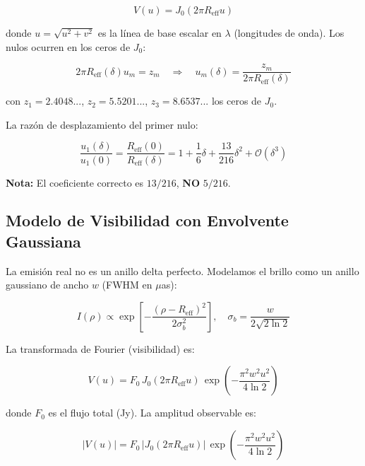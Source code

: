 \documentclass[12pt,a4paper]{article}
\begin{document}
\begin{equation}
V(u) = J_0(2\pi R_{\text{eff}} u)
\end{equation}

donde $u = \sqrt{u^2+v^2}$ es la línea de base escalar en $\lambda$ (longitudes de onda). Los nulos ocurren en los ceros de $J_0$:

\begin{equation}
2\pi R_{\text{eff}}(\delta) u_m = z_m \quad \Rightarrow \quad u_m(\delta) = \frac{z_m}{2\pi R_{\text{eff}}(\delta)}
\end{equation}

con $z_1 = 2.4048...$, $z_2 = 5.5201...$, $z_3 = 8.6537...$ los ceros de $J_0$.

La razón de desplazamiento del primer nulo:

\begin{equation}
\frac{u_1(\delta)}{u_1(0)} = \frac{R_{\text{eff}}(0)}{R_{\text{eff}}(\delta)} = 1 + \frac{1}{6}\delta + \frac{13}{216}\delta^2 + \mathcal{O}(\delta^3)
\end{equation}

\textbf{Nota:} El coeficiente correcto es $13/216$, \textbf{NO} $5/216$.

\subsection{Modelo de Visibilidad con Envolvente Gaussiana}

La emisión real no es un anillo delta perfecto. Modelamos el brillo como un anillo gaussiano de ancho $w$ (FWHM en $\mu$as):

\begin{equation}
I(\rho) \propto \exp\left[-\frac{(\rho - R_{\text{eff}})^2}{2\sigma_b^2}\right], \quad \sigma_b = \frac{w}{2\sqrt{2\ln 2}}
\end{equation}

La transformada de Fourier (visibilidad) es:

\begin{equation}
V(u) = F_0 \, J_0(2\pi R_{\text{eff}} u) \, \exp\left(-\frac{\pi^2 w^2 u^2}{4\ln 2}\right)
\end{equation}

donde $F_0$ es el flujo total (Jy). La amplitud observable es:

\begin{equation}
|V(u)| = F_0 \, |J_0(2\pi R_{\text{eff}} u)| \, \exp\left(-\frac{\pi^2 w^2 u^2}{4\ln 2}\right)
\end{equation}
\end{document}
